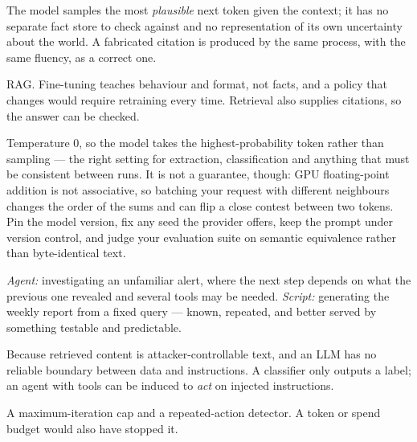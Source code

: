 \begin{ans}
  \item The model samples the most \emph{plausible} next token given the context; it
        has no separate fact store to check against and no representation of its own
        uncertainty about the world. A fabricated citation is produced by the same
        process, with the same fluency, as a correct one.
  \item RAG. Fine-tuning teaches behaviour and format, not facts, and a policy that
        changes would require retraining every time. Retrieval also supplies
        citations, so the answer can be checked.
  \item Temperature 0, so the model takes the highest-probability token rather than
        sampling --- the right setting for extraction, classification and anything
        that must be consistent between runs. It is not a guarantee, though: GPU
        floating-point addition is not associative, so batching your request with
        different neighbours changes the order of the sums and can flip a close
        contest between two tokens. Pin the model version, fix any seed the provider
        offers, keep the prompt under version control, and judge your evaluation
        suite on semantic equivalence rather than byte-identical text.
\end{ans}

\begin{ans}
  \item \emph{Agent:} investigating an unfamiliar alert, where the next step depends
        on what the previous one revealed and several tools may be needed.
        \emph{Script:} generating the weekly report from a fixed query --- known,
        repeated, and better served by something testable and predictable.
  \item Because retrieved content is attacker-controllable text, and an LLM has no
        reliable boundary between data and instructions. A classifier only outputs a
        label; an agent with tools can be induced to \emph{act} on injected
        instructions.
  \item A maximum-iteration cap and a repeated-action detector. A token or spend
        budget would also have stopped it.
\end{ans}

